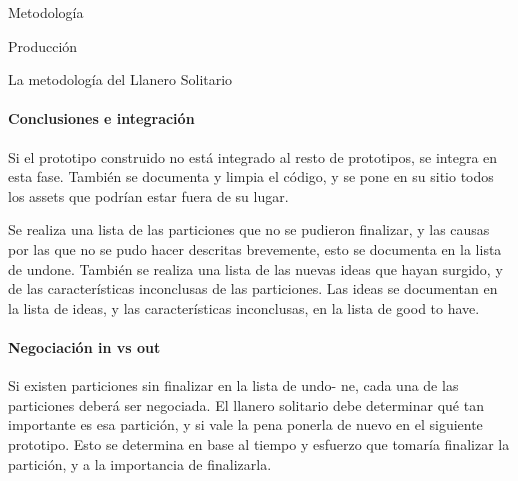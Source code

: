 \begin{section}{Metodología}
\begin{subsection}{Producción}
\begin{subsubsection}{La metodología del Llanero Solitario}
      \paragraph{Conclusiones e integración} Si el prototipo construido no está integrado al resto de prototipos, se integra en esta fase. También se documenta y limpia el código, y se pone en su sitio todos los assets que podrían estar fuera de su lugar.

      Se realiza una lista de las particiones que no se pudieron finalizar, y las causas por las que no se pudo hacer descritas brevemente, esto se documenta en la lista de undone. También se realiza una lista de las nuevas ideas que hayan surgido, y de las características inconclusas de las particiones. Las ideas se documentan en la lista de ideas, y las características inconclusas, en la lista de good to have.

      \paragraph{Negociación in vs out} Si existen particiones sin finalizar en la lista de undo- ne, cada una de las particiones deberá ser negociada. El llanero solitario debe determinar qué tan importante es esa partición, y si vale la pena ponerla de nuevo en el siguiente prototipo. Esto se determina en base al tiempo y esfuerzo que tomaría finalizar la partición, y a la importancia de finalizarla.
    \end{subsubsection}
  \end{subsection}
\end{section}
